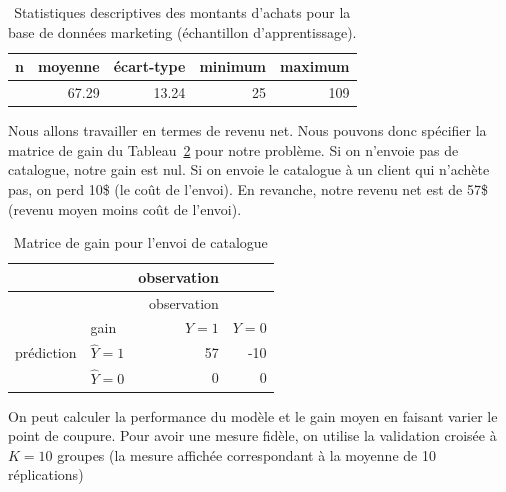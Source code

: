 \documentclass[
  11pt,
  letterpaper,
]{scrbook}
\theoremstyle{definition}
\theoremstyle{remark}
\begin{document}
\begin{longtable}[]{@{}rrrrr@{}}

\caption{\label{tbl-dbm-ymontant-apprentissage}Statistiques descriptives
des montants d'achats pour la base de données marketing (échantillon
d'apprentissage).}

\tabularnewline

\toprule\noalign{}
n & moyenne & écart-type & minimum & maximum \\
\midrule\noalign{}
\endhead
\bottomrule\noalign{}
\endlastfoot
210 & 67.29 & 13.24 & 25 & 109 \\

\end{longtable}

Nous allons travailler en termes de revenu net. Nous pouvons donc
spécifier la matrice de gain du Tableau~\ref{tbl-03-gain3} pour notre
problème. Si on n'envoie pas de catalogue, notre gain est nul. Si on
envoie le catalogue à un client qui n'achète pas, on perd 10\$ (le coût
de l'envoi). En revanche, notre revenu net est de 57\$ (revenu moyen
moins coût de l'envoi).

\begin{longtable}[]{@{}llrr@{}}
\caption{Matrice de gain pour l'envoi de
catalogue}\label{tbl-03-gain3}\tabularnewline
\toprule\noalign{}
& & observation & \\
\midrule\noalign{}
\endfirsthead
\toprule\noalign{}
& & observation & \\
\midrule\noalign{}
\endhead
\bottomrule\noalign{}
\endlastfoot
& gain & \(Y=1\) & \(Y=0\) \\
prédiction & \(\widehat{Y}=1\) & 57 & -10 \\
& \(\widehat{Y}=0\) & 0 & 0 \\
\end{longtable}

On peut calculer la performance du modèle et le gain moyen en faisant
varier le point de coupure. Pour avoir une mesure fidèle, on utilise la
validation croisée à \(K=10\) groupes (la mesure affichée correspondant
à la moyenne de 10 réplications)
\end{document}
